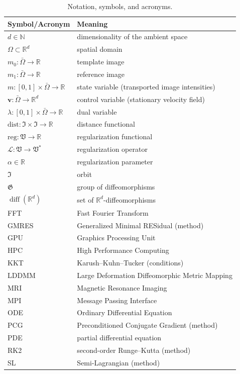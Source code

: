 \documentclass[11pt]{amsart}
\newcommand\fs[1]{\ensuremath{\mathfrak{#1}}}
\newcommand\op[1]{\ensuremath{\mathcal{#1}}}
\newcommand{\reg}{\ensuremath{\text{reg}}}
\newcommand{\dist}{\ensuremath{\text{dist}}}
\renewcommand{\vec}[1]{\ensuremath{\boldsymbol{#1}}}
\newcommand\dual{\ensuremath{\ast}}
\begin{document}
\begin{table}
\caption{Notation, symbols, and acronyms.\label{t:notation}}
\centering
\begin{tabular}{ll}\toprule
\bf Symbol/Acronym & \bf Meaning \\
\midrule
$d \in \mathbb{N}$ & dimensionality of the ambient space\\
$\Omega \subset \mathbb{R}^d$ & spatial domain \\
$m_0 : \bar{\Omega} \to \mathbb{R}$ & template image \\
$m_1 : \bar{\Omega} \to \mathbb{R}$ & reference image \\
$m : [0,1] \times \bar{\Omega} \to \mathbb{R}$ & state variable (transported image intensities) \\
$\vec{v} : \bar{\Omega} \to \mathbb{R}^d$ & control variable (stationary velocity field)\\
$\lambda : [0,1] \times \bar{\Omega} \to \mathbb{R}$ & dual variable \\
$\dist : \fs{I} \times \fs{I} \to \mathbb{R}$ & distance functional \\
$\reg : \fs{V} \to \mathbb{R}$ & regularization functional \\
$\op{L} : \fs{V} \to \fs{V}^\dual$ & regularization operator \\
$\alpha \in \mathbb{R}$ & regularization parameter \\
$\fs{I}$ & orbit \\
$\fs{G}$ & group of diffeomorphisms \\
$\operatorname{diff}(\mathbb{R}^d)$ & set of $\mathbb{R}^d$-diffeomorphisms \\
\midrule
FFT   & Fast Fourier Transform\\
GMRES & Generalized Minimal RESidual (method)\\
GPU   & Graphics Processing Unit\\
HPC   & High Performance Computing\\
KKT   & Karush--Kuhn--Tucker (conditions)\\
LDDMM & Large Deformation Diffeomorphic Metric Mapping\\
MRI   & Magnetic Resonance Imaging\\
MPI   & Message Passing Interface\\
ODE   & Ordinary Differential Equation\\
PCG   & Preconditioned Conjugate Gradient (method)\\
PDE   & partial differential equation\\
RK2   & second-order Runge--Kutta (method)\\
SL    & Semi-Lagrangian (method)\\
\bottomrule
\end{tabular}
\end{table}
\end{document}
